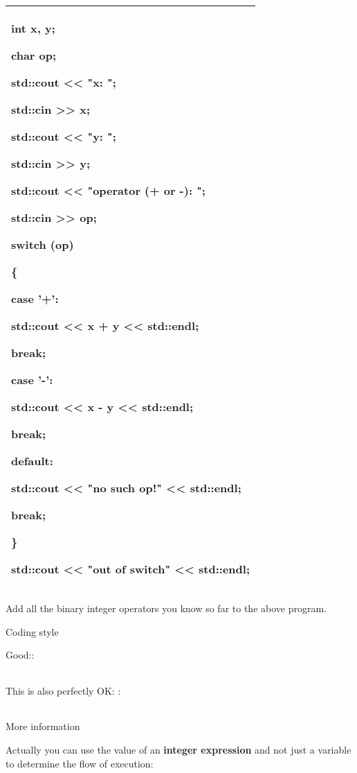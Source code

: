 \documentclass[
]{article}
\begin{document}
\begin{longtable}[]{@{}l@{}}
\toprule
\endhead
\begin{minipage}[t]{0.97\columnwidth}\raggedright
int x, y;

char op;

std::cout \textless\textless{} "x: ";

std::cin \textgreater\textgreater{} x;

std::cout \textless\textless{} "y: ";

std::cin \textgreater\textgreater{} y;

std::cout \textless\textless{} "operator (+ or -): ";

std::cin \textgreater\textgreater{} op;

switch (op)

\{

case '+':

std::cout \textless\textless{} x + y \textless\textless{} std::endl;

break;

case '-':

std::cout \textless\textless{} x - y \textless\textless{} std::endl;

break;

default:

std::cout \textless\textless{} "no such op!" \textless\textless{}
std::endl;

break;

\}

std::cout \textless\textless{} "out of switch" \textless\textless{}
std::endl;\strut
\end{minipage}\tabularnewline
\bottomrule
\end{longtable}

Add all the binary integer operators you know so far to the above
program.

Coding style

Good::

\begin{longtable}[]{@{}@{}}
\toprule
\endhead
\bottomrule
\end{longtable}

This is also perfectly OK: :

\begin{longtable}[]{@{}@{}}
\toprule
\endhead
\bottomrule
\end{longtable}

More information

Actually you can use the value of an \textbf{integer expression} and not
just a variable to determine the flow of execution:
\end{document}
